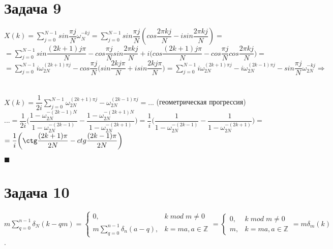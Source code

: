 \documentclass{article}
\title{}
\author{
	Дерюгин Денис, студент 561-й учебной группы
}
\date{\today}
\newcommand\proofend{\begin{flushright}$\blacksquare$\end{flushright}}
\begin{document}
\maketitle
\large{
	\section*{Задача 9}

	$X(k) = \sum\limits_{j=0}^{N-1}sin\dfrac{\pi j}{N}\omega_N^{-kj} = \sum\limits_{j=0}^{N-1}sin\dfrac{\pi j}{N}(cos\dfrac{2\pi k j}{N} - isin\dfrac{2\pi k j}{N}) = $\\
	$= \sum\limits_{j=0}^{N-1} sin\dfrac{(2k+1)j\pi}{N} - cos\dfrac{\pi j}{N}sin\dfrac{2\pi k j}{N} + i\bigg (cos \dfrac{(2k+1)j\pi}{N} - cos\dfrac{\pi j}{N}cos\dfrac{2\pi k j}{N} \bigg ) =$ \\
	$= \sum\limits_{j=0}^{N-1} i\omega_{2N}^{(2k+1)\pi j} - cos\dfrac{\pi j}{N} \bigg (sin \dfrac{2kj\pi}{N} +i sin \dfrac{2kj\pi}{N} \bigg) = \sum\limits_{j=0}^{N-1} i\omega_{2N}^{(2k+1)\pi j} - i\omega_{2N}^{(2k-1) \pi j} - sin\dfrac{\pi j}{N} \omega_{2N}^{-kj} \Rightarrow$ \\ \\ \\
	$X(k) = \dfrac{1}{2i} \sum\limits_{j=0}^{N-1} \omega_{2N}^{(2k+1)\pi j} - \omega_{2N}^{(2k-1) \pi j} = ...$ (геометрическая прогрессия) \\
	$... = \dfrac{1}{2i} \bigg ( \dfrac{1 - \omega_{2N}^{-(2k - 1)N}}{1 - \omega_{2N}^{-(2k-1)}} - \dfrac{1 - \omega_{2N}^{-(2k + 1)N}}{1 - \omega_{2N}^{-(2k+1)}} \bigg ) = \dfrac{1}{i} \bigg ( \dfrac{1}{1 - \omega_{2N}^{-(2k-1)}} - \dfrac{1}{1 - \omega_{2N}^{-(2k+1)}} \bigg ) =$\\
	$= \dfrac{1}{i} \bigg ( \ctg \dfrac{(2k+1)\pi}{2N} - ctg\dfrac{(2k-1)\pi}{2N} \bigg )$
	\proofend

	\section*{Задача 10}
	$m\sum\limits_{q=0}^{n-1}\delta_N(k - qm) = \left\{\begin{matrix}
		0, & k\;mod\;m \neq 0 \\
		m\sum\limits_{q=0}^{n-1}\delta_n(a-q), & k = ma, a \in \mathbb{Z}
	\end{matrix}\right. = \left\{\begin{matrix}
		0, & k\;mod\;m \neq 0 \\
		m, & k = ma, a \in \mathbb{Z}
	\end{matrix}\right. = m\delta_m(k)$.

}
\end{document}
